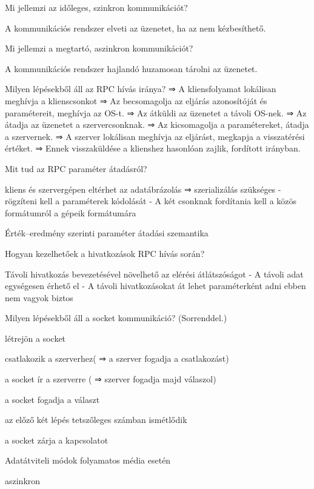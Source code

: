 \documentclass[12pt]{article}
\begin{document}
\begin{description}[style=unboxed]
    \item  Mi jellemzi az időleges, szinkron kommunikációt?
    \item A kommunikációs rendszer elveti az üzenetet, ha az nem kézbesíthető.
    \item  Mi jellemzi a megtartó, aszinkron kommunikációt?
    \item A kommunikációs rendszer hajlandó huzamosan tárolni az üzenetet.
    \item  Milyen lépésekből áll az RPC hívás iránya?
        ⇒ A kliensfolyamat lokálisan meghívja a klienscsonkot
        ⇒ Az becsomagolja az eljárás azonosítóját és paramétereit, meghívja az OS-t.
        ⇒ Az átküldi az üzenetet a távoli OS-nek.
        ⇒ Az átadja az üzenetet a szervercsonknak.
        ⇒ Az kicsomagolja a paramétereket, átadja a szervernek.
        ⇒ A szerver lokálisan meghívja az eljárást, megkapja a visszatérési értéket.
        ⇒ Ennek visszaküldése a klienshez hasonlóan zajlik, fordított irányban.
    \item  Mit tud az RPC paraméter átadásról?
    \item kliens és szervergépen eltérhet az adatábrázolás ⇒ szerializálás szükséges
        - rögzíteni kell a paraméterek kódolását
        - A két csonknak fordítania kell a közös formátumról a gépeik formátumára
    \item Érték–eredmény szerinti paraméter átadási szemantika
    \item  Hogyan kezelhetőek a hivatkozások RPC hívás során?
    \item Távoli hivatkozás bevezetésével növelhető az elérési átlátszóságot
        - A távoli adat egységesen érhető el
        - A távoli hivatkozásokat át lehet paraméterként adni
        ebben nem vagyok biztos
    \item  Milyen lépésekből áll a socket kommunikáció? (Sorrenddel.)
    \item létrejön a socket
    \item csatlakozik a szerverhez( ⇒ a szerver fogadja a csatlakozást)
    \item a socket ír a szerverre ( ⇒ szerver fogadja majd válaszol)
    \item a socket fogadja a választ
    \item az előző két lépés tetszőleges számban ismétlődik
    \item a socket zárja a kapcsolatot
    \item  Adatátviteli módok folyamatos média esetén
    \item aszinkron

\end{description}
\end{document}
